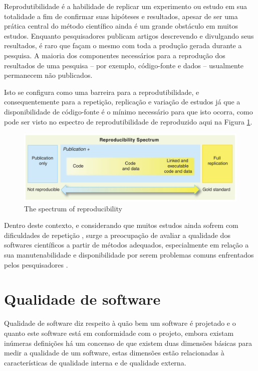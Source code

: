 \documentclass[qual, classic, a4paper]{ufbathesis}
\begin{document}
Reprodutibilidade é a habilidade de replicar um experimento ou estudo em sua
totalidade a fim de confirmar suas hipóteses e resultados, apesar de ser uma
prática central do método científico ainda é um grande obstáculo em muitos
estudos. Enquanto pesquisadores publicam artigos descrevendo e divulgando seus
resultados, é raro que façam o mesmo com toda a produção gerada durante a
pesquisa. A maioria dos componentes necessários para a reprodução dos
resultados de uma pesquisa -- por exemplo, código-fonte e dados -- usualmente
permanecem não publicados.

Isto se configura como uma barreira para a reprodutibilidade, e
consequentemente para a repetição, replicação e variação de estudos
\cite{Feitelson2015} já que a disponibilidade de código-fonte é o mínimo
necessário para que isto ocorra, como pode ser visto no espectro de
reprodutibilidade de  reproduzido aqui na Figura
\ref{reproducibility-spectrum}.

\begin{figure}[h]
  \center
  \includegraphics[scale=0.25]{imagens/reproducibility-spectrum.png}
  \caption{The spectrum of reproducibility\cite{Peng2011}}
  \label{reproducibility-spectrum}
\end{figure}

Dentro deste contexto, e considerando que muitos estudos ainda sofrem com
dificuldades de repetição \cite{Tang2016}, surge a preocupação de avaliar a
qualidade dos softwares científicos a partir de métodos adequados,
especialmente em relação a sua manutenabilidade e disponibilidade por serem
problemas comuns enfrentados pelos pesquisadores \cite{Prlic2012}.

\section{Qualidade de software}

Qualidade de software diz respeito à quão bem um software é projetado e o
quanto este software está em conformidade com o projeto, embora existam
inúmeras definições há um concenso de que existem duas dimensões básicas para medir a
qualidade de um software, estas dimensões estão relacionadas à características
de qualidade interna e de qualidade externa.
\end{document}
